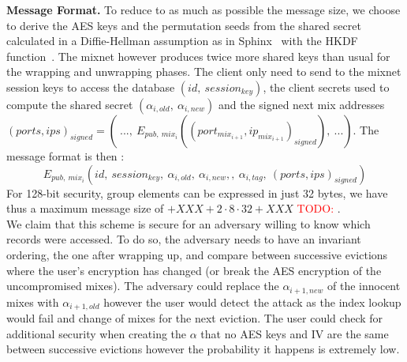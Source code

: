 \documentclass{llncs}
\newcommand{\todo}[1]{\textcolor{red}{TODO: #1}}
\begin{document}
\noindent\textbf{Message Format.}
To reduce to as much as possible the message size, we choose to derive the AES keys and the permutation seeds from the shared secret calculated in a Diffie-Hellman assumption as in Sphinx~\cite{danezis2009sphinx} with the HKDF function~\cite{krawczyk2010cryptographic}. The mixnet however produces twice more shared keys than usual for the wrapping and unwrapping phases. \iffalse\\
Let $\kappa$ be the security parameter. We call $\mathcal{G}$ a prime order cyclic group satisfying the Decisional Diffie-Hellman Assumption. $\mathcal{G}^*$ is the set of non-identity elements of $\mathcal{G}$. The element $g$ is a generator of the group, and $q$ is the prime order of $\mathcal{G}$ with $q \approx 2^{2\kappa}$.\\
We suppose each mix owns a pair of keys ($\ priv_i \in \mathbb{Z}_{q}^*$, $pub_i=g^{priv_i}\in \mathcal{G}^*$). We assume the existence of a PKI that publishes a list of all ($mix_i$,\ $pub_i$) pair.
The client randomly chooses $x\in_\mathcal{R} \mathbb{Z}_q^*$ and sends to the mix $mix_i$ the element $\alpha_i=g^{x\cdot b_i}$ with $b_i$ a binding factors, the shared secret is then $s_i=pub_i^{x\cdot b_i}$.
\fi
The client only need to send to the mixnet session keys to access the database $(id,\ session_{key})$, the client secrets used to compute the shared secret $( \alpha_{i,old},\ \alpha_{i,new} )$ and the signed next mix addresses $(ports,ips)_{signed}= \left (\ ...,\ E_{pub,\ mix_{i}}\left ((port_{mix_{i+1}}, ip_{mix_{i+1}})_{signed}\right),\ ...\right)$.
The message format is then : $$E_{pub,\ mix_i}\left(id,\ session_{key},\ \alpha_{i,old},\ \alpha_{i,new},,\ \alpha_{i,tag},\ (ports,ips)_{signed} \right)$$ 
For 128-bit security, group elements can be expressed in just 32 bytes, we have thus a maximum message size of $+XXX + 2 \cdot 8 \cdot 32 + XXX$ \todo{}.\\

We claim that this scheme is secure for an adversary willing to know which records were accessed. To do so, the adversary needs to have an invariant ordering, the one after wrapping up, and compare between successive evictions where the user's encryption has changed (or break the AES encryption of the uncompromised mixes). 
The adversary could replace the $\alpha_{i+1,new}$ of the innocent mixes with $\alpha_{i+1, old}$ however the user would detect the attack as the index lookup would fail and change of mixes for the next eviction.
The user could check for additional security when creating the $\alpha$ that no AES keys and IV are the same between successive evictions however the probability it happens is extremely low.
%
\end{document}
